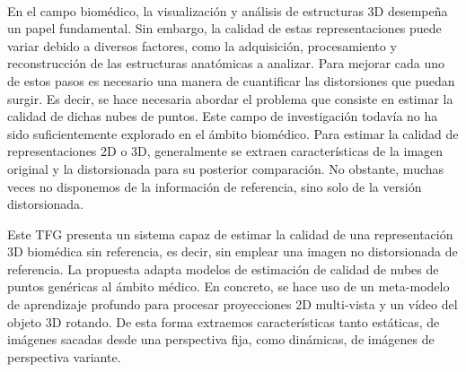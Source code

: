 \chapter*{}


% 


\thispagestyle{empty}

\begin{center}
{\large\bfseries \myTitle}\\
\end{center}
\begin{center}
\myName\\
\end{center}

\\

\\
En el campo biomédico, la visualización y análisis de estructuras 3D
desempeña un papel fundamental. 
Sin embargo, la calidad de estas representaciones puede variar debido a diversos 
factores, como la adquisición, procesamiento y reconstrucción de las estructuras anatómicas a analizar. 
Para mejorar cada uno de estos pasos es necesario una manera de cuantificar las distorsiones que puedan surgir. 
Es decir, se hace necesaria abordar el problema que consiste en estimar la calidad 
de dichas nubes de puntos. Este campo de investigación todavía no ha sido 
suficientemente explorado en el ámbito biomédico.
Para estimar la calidad de representaciones 2D o 3D, generalmente se extraen características de la imagen original y la distorsionada para su posterior 
comparación.
No obstante, muchas veces no disponemos de la información de referencia, sino solo de la versión distorsionada.
\smallskip

Este TFG presenta un sistema capaz de estimar la calidad de 
una representación 3D biomédica sin referencia, es decir, sin emplear una imagen 
no distorsionada de referencia. La propuesta 
adapta modelos de estimación de calidad de nubes de puntos genéricas 
al ámbito médico. En concreto, se hace uso de un meta-modelo de aprendizaje profundo para 
procesar proyecciones 2D multi-vista y un vídeo del objeto 3D rotando. 
De esta forma extraemos características tanto estáticas, de imágenes 
sacadas desde una perspectiva fija, como dinámicas, de imágenes de 
perspectiva variante.
\smallskip

